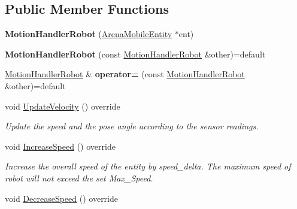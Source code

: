 \subsection*{Public Member Functions}
\begin{DoxyCompactItemize}
\item 
{\bfseries Motion\+Handler\+Robot} (\hyperlink{classArenaMobileEntity}{Arena\+Mobile\+Entity} $\ast$ent)\hypertarget{classMotionHandlerRobot_a4b52a0b181837a8d63c39f71811d691b}{}\label{classMotionHandlerRobot_a4b52a0b181837a8d63c39f71811d691b}

\item 
{\bfseries Motion\+Handler\+Robot} (const \hyperlink{classMotionHandlerRobot}{Motion\+Handler\+Robot} \&other)=default\hypertarget{classMotionHandlerRobot_a66445cc9057e3ef9298b5bd239df6d4e}{}\label{classMotionHandlerRobot_a66445cc9057e3ef9298b5bd239df6d4e}

\item 
\hyperlink{classMotionHandlerRobot}{Motion\+Handler\+Robot} \& {\bfseries operator=} (const \hyperlink{classMotionHandlerRobot}{Motion\+Handler\+Robot} \&other)=default\hypertarget{classMotionHandlerRobot_a48181f197ffb864f16e29721ad964e4a}{}\label{classMotionHandlerRobot_a48181f197ffb864f16e29721ad964e4a}

\item 
void \hyperlink{classMotionHandlerRobot_acd2cdb615d806dcf809142e84569ca9d}{Update\+Velocity} () override
\begin{DoxyCompactList}\small\item\em Update the speed and the pose angle according to the sensor readings. \end{DoxyCompactList}\item 
void \hyperlink{classMotionHandlerRobot_a93ea16501b7b8c0bd78edb2681aa3b6d}{Increase\+Speed} () override\hypertarget{classMotionHandlerRobot_a93ea16501b7b8c0bd78edb2681aa3b6d}{}\label{classMotionHandlerRobot_a93ea16501b7b8c0bd78edb2681aa3b6d}

\begin{DoxyCompactList}\small\item\em Increase the overall speed of the entity by speed\+\_\+delta. The maximum speed of robot will not exceed the set Max\+\_\+\+Speed. \end{DoxyCompactList}\item 
void \hyperlink{classMotionHandlerRobot_a89e9b8b4e22fb021d7d67c817e66b7b2}{Decrease\+Speed} () override\hypertarget{classMotionHandlerRobot_a89e9b8b4e22fb021d7d67c817e66b7b2}{}\label{classMotionHandlerRobot_a89e9b8b4e22fb021d7d67c817e66b7b2}


\end{DoxyCompactItemize}
